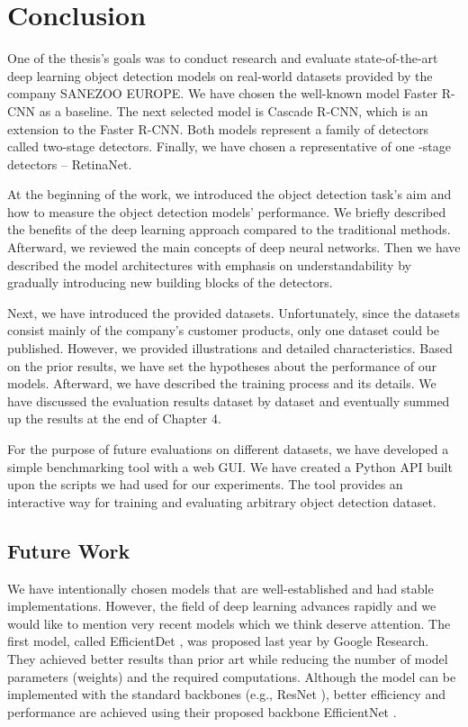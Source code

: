 \chapter{Conclusion}\label{chap:conclusion}

One of the thesis's goals was to conduct research and evaluate state-of-the-art
deep learning object detection models on real-world datasets provided by the
company SANEZOO EUROPE. We have chosen the well-known model Faster R-CNN as a
baseline. The next selected model is Cascade R-CNN, which is an extension to the
Faster R-CNN. Both models represent a family of detectors called two-stage
detectors. Finally, we have chosen a representative of one -stage detectors --
RetinaNet.

At the beginning of the work, we introduced the object detection task's aim and
how to measure the object detection models' performance. We briefly described
the benefits of the deep learning approach compared to the traditional methods.
Afterward, we reviewed the main concepts of deep neural networks. Then we have
described the model architectures with emphasis on understandability by
gradually introducing new building blocks of the detectors.

Next, we have introduced the provided datasets. Unfortunately, since the
datasets consist mainly of the company's customer products, only one dataset
could be published. However, we provided illustrations and detailed
characteristics. Based on the prior results, we have set the hypotheses about
the performance of our models. Afterward, we have described the training
process and its details. We have discussed the evaluation results dataset by
dataset and eventually summed up the results at the end of Chapter 4.

For the purpose of future evaluations on different datasets, we have developed
a simple benchmarking tool with a web GUI. We have created a Python API built
upon the scripts we had used for our experiments. The tool provides an
interactive way for training and evaluating arbitrary object detection dataset.

\section{Future Work}
We have intentionally chosen models that are well-established and had stable
implementations. However, the field of deep learning advances rapidly and we
would like to mention very recent models which we think deserve attention. The
first model, called EfficientDet \cite{efficientdet}, was proposed last year by
Google Research. They achieved better results than prior art while reducing the
number of model parameters (weights) and the required computations. Although the
model can be implemented with the standard backbones (e.g., ResNet
\cite{resnet}), better efficiency and performance are achieved using their
proposed backbone EfficientNet \cite{efficientnet}.

